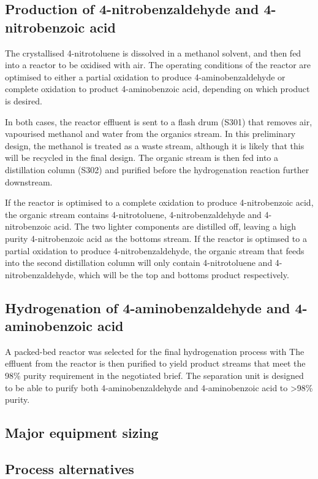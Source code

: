 \subsection{Production of 4-nitrobenzaldehyde and 4-nitrobenzoic acid}
The crystallised 4-nitrotoluene is dissolved in a methanol solvent, and then fed into a reactor to be oxidised with air. The operating conditions of the reactor are optimised to either a partial oxidation to produce 4-aminobenzaldehyde or complete oxidation to product 4-aminobenzoic acid, depending on which product is desired.

In both cases, the reactor effluent is sent to a flash drum (S301) that removes air, vapourised methanol and water from the organics stream. In this preliminary design, the methanol is treated as a waste stream, although it is likely that this will be recycled in the final design. The organic stream is then fed into a distillation column (S302) and purified before the hydrogenation reaction further downstream.

If the reactor is optimised to a complete oxidation to produce 4-nitrobenzoic acid, the organic stream contains 4-nitrotoluene, 4-nitrobenzaldehyde and 4-nitrobenzoic acid. The two lighter components are distilled off, leaving a high purity 4-nitrobenzoic acid as the bottoms stream. If the reactor is optimsed to a partial oxidation to produce 4-nitrobenzaldehyde, the organic stream that feeds into the second distillation column will only contain 4-nitrotoluene and 4-nitrobenzaldehyde, which will be the top and bottoms product respectively. 

\subsection{Hydrogenation of 4-aminobenzaldehyde and 4-aminobenzoic acid}

A packed-bed reactor was selected for the final hydrogenation process with 
The effluent from the reactor is then purified to yield product streams that meet the 98\% purity requirement in the negotiated brief. The separation unit is designed to be able to purify both 4-aminobenzaldehyde and 4-aminobenzoic acid to >98\% purity.

\subsection{Major equipment sizing}


\subsection{Process alternatives}


